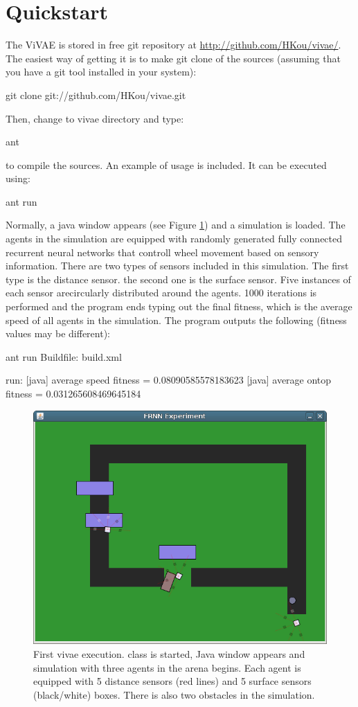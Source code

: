 \section*{Quickstart}

The ViVAE is stored in free git repository at \url{http://github.com/HKou/vivae/}. The easiest way of getting it is to make git clone of the sources (assuming that you have a git tool installed in your system):

\begin{colorverbatim}
git clone git://github.com/HKou/vivae.git 
\end{colorverbatim}

Then, change to vivae directory and type:

\begin{colorverbatim}
ant
\end{colorverbatim}

to compile the sources.
An example of usage is included. It can be executed using:

\begin{colorverbatim}
ant run
\end{colorverbatim}

Normally, a java window appears (see Figure \ref{fig:intro}) and a simulation is loaded. The agents in the simulation are equipped with randomly generated fully connected recurrent neural networks that controll wheel movement based on sensory information. There are two types of sensors included in this simulation. The first type is the distance sensor. the second one is the surface sensor. Five instances of each sensor arecircularly distributed around the agents. 1000 iterations is performed and the program ends typing out the final fitness, which is the average speed of all agents in the simulation. The program outputs the following (fitness values may be different):


\begin{colorverbatim}
ant run
Buildfile: build.xml

run:
     [java] average speed fitness = 0.08090585578183623
     [java] average ontop fitness = 0.031265608469645184
\end{colorverbatim}

\begin{figure}[h!]
\centering
\includegraphics[width=.5\textwidth]{figures/intro}
\caption{First vivae execution.  class is started, Java window appears and simulation with three agents in the arena begins. Each agent is equipped with 5 distance sensors (red lines) and 5 surface sensors (black/white) boxes. There is also two obstacles in the simulation.}
\label{fig:intro}
\end{figure}


